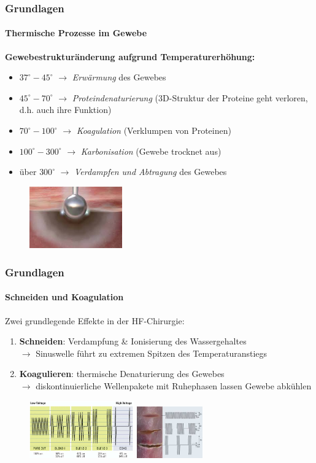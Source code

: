 \documentclass{beamer}
\begin{document}
\begin{frame}
\frametitle{Grundlagen}
\framesubtitle{Thermische Prozesse im Gewebe}
\textbf{Gewebestrukturänderung aufgrund Temperaturerhöhung:}
	\begin{itemize}
		\item $37^\circ-45^\circ$ $\rightarrow$ \emph{Erwärmung} des Gewebes
		\item $45^\circ-70^\circ$ $\rightarrow$ \emph{Proteindenaturierung} (3D-Struktur der Proteine geht verloren, d.h. auch ihre Funktion)
		\item $70^\circ-100^\circ$ $\rightarrow$ \emph{Koagulation} (Verklumpen von Proteinen)
		\item $100^\circ-300^\circ$ $\rightarrow$ \emph{Karbonisation} (Gewebe trocknet aus)
		\item über $300^\circ$ $\rightarrow$ \emph{Verdampfen und Abtragung} des Gewebes
	\end{itemize}
	\begin{figure}
		\centering
		\includegraphics[width=4cm]{images/thermGewebe.jpg}
	\end{figure}
\end{frame}




\begin{frame}
\frametitle{Grundlagen}
\framesubtitle{Schneiden und Koagulation}
	Zwei grundlegende Effekte in der HF-Chirurgie:
	\vspace{0.5cm}
	\begin{enumerate}
		\item \textbf{Schneiden}: Verdampfung \& Ionisierung des Wassergehaltes
		\\$\rightarrow$ Sinuswelle führt zu extremen Spitzen des Temperaturanstiegs
		\vspace{0.1cm}
		\item \textbf{Koagulieren}: thermische Denaturierung des Gewebes
		\\$\rightarrow$ diskontinuierliche Wellenpakete mit Ruhephasen lassen Gewebe abkühlen
	\end{enumerate}
	\begin{figure}
	\includegraphics[width=4.5cm]{images/_stromModi.png}
	\hspace{0.5cm}
	\includegraphics[width=2.85cm]{images/krammeHF.jpg}
	\cite{stromModi}
	\end{figure}
\end{frame}
\end{document}
